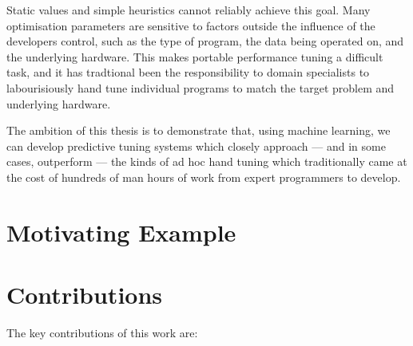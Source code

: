 Static values and simple heuristics cannot reliably achieve this
goal. Many optimisation parameters are sensitive to factors outside
the influence of the developers control, such as the type of program,
the data being operated on, and the underlying hardware. This makes
portable performance tuning a difficult task, and it has tradtional
been the responsibility to domain specialists to labourisiously hand
tune individual programs to match the target problem and underlying
hardware.

The ambition of this thesis is to demonstrate that, using machine
learning, we can develop predictive tuning systems which closely
approach --- and in some cases, outperform --- the kinds of ad hoc
hand tuning which traditionally came at the cost of hundreds of man
hours of work from expert programmers to develop.


\section{Motivating Example}



\section{Contributions}

The key contributions of this work are:

